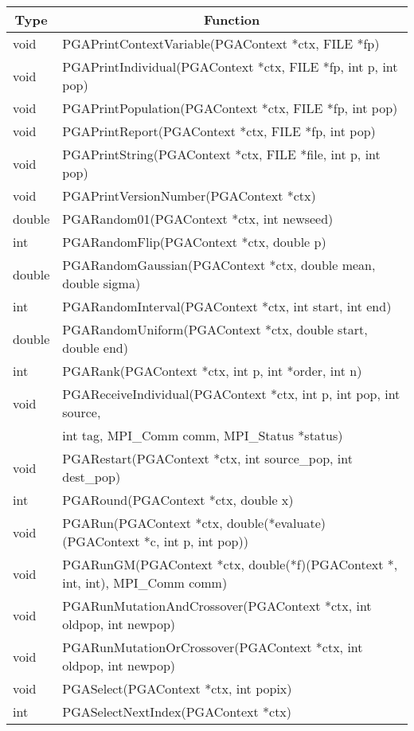 \documentclass{report}
\begin{document}
\begin{tabular}{|l|l|} \hline\hline
\multicolumn{1}{|c|}{Type} &
\multicolumn{1}{c|}{Function}  \\  \hline\hline
void &  PGAPrintContextVariable(PGAContext *ctx, FILE *fp) \\ \hline
void &  PGAPrintIndividual(PGAContext *ctx, FILE *fp, int p, int pop) \\ \hline
void &  PGAPrintPopulation(PGAContext *ctx, FILE *fp, int pop) \\ \hline
void &  PGAPrintReport(PGAContext *ctx, FILE *fp, int pop) \\ \hline
void &  PGAPrintString(PGAContext *ctx, FILE *file, int p, int pop) \\ \hline
void &  PGAPrintVersionNumber(PGAContext *ctx) \\ \hline
double &  PGARandom01(PGAContext *ctx, int newseed) \\ \hline
int &  PGARandomFlip(PGAContext *ctx, double p) \\ \hline
double &  PGARandomGaussian(PGAContext *ctx, double mean, double sigma) \\ \hline
int &  PGARandomInterval(PGAContext *ctx, int start, int end) \\ \hline
double &  PGARandomUniform(PGAContext *ctx, double start, double end) \\ \hline
int &  PGARank(PGAContext *ctx, int p, int *order, int n) \\ \hline
void &  PGAReceiveIndividual(PGAContext *ctx, int p, int pop, int source, \\
     &  int tag, MPI\_Comm comm, MPI\_Status *status) \\ \hline
void &  PGARestart(PGAContext *ctx, int source\_pop, int dest\_pop) \\ \hline
int &  PGARound(PGAContext *ctx, double x) \\ \hline
void &  PGARun(PGAContext *ctx, double(*evaluate)(PGAContext *c, int p, int
pop)) \\ \hline
void &  PGARunGM(PGAContext *ctx, double(*f)(PGAContext *, int, int), MPI\_Comm
comm) \\ \hline
void &  PGARunMutationAndCrossover(PGAContext *ctx, int oldpop, int newpop) \\
\hline
void &  PGARunMutationOrCrossover(PGAContext *ctx, int oldpop, int newpop) \\ \hline
void &  PGASelect(PGAContext *ctx, int popix) \\ \hline
int &  PGASelectNextIndex(PGAContext *ctx) \\ \hline

\end{tabular}
\end{document}
